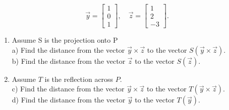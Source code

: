 \documentclass[10pt]{article}
\begin{document}
$$
\vec{y}=\left[\begin{array}{l}
1 \\
0 \\
1
\end{array}\right], \quad \vec{z}=\left[\begin{array}{c}
1 \\
2 \\
-3
\end{array}\right] .
$$

\begin{enumerate}
  \item Assume S is the projection onto P\\
a) Find the distance from the vector $\vec{y} \times \vec{z}$ to the vector $S(\vec{y} \times \vec{z})$.\\
b) Find the distance from the vector $\vec{z}$ to the vector $S(\vec{z})$.
  \item Assume $T$ is the reflection across $P$.\\
c) Find the distance from the vector $\vec{y} \times \vec{z}$ to the vector $T(\vec{y} \times \vec{z})$.\\
d) Find the distance from the vector $\vec{y}$ to the vector $T(\vec{y})$.
\end{enumerate}
\end{document}
